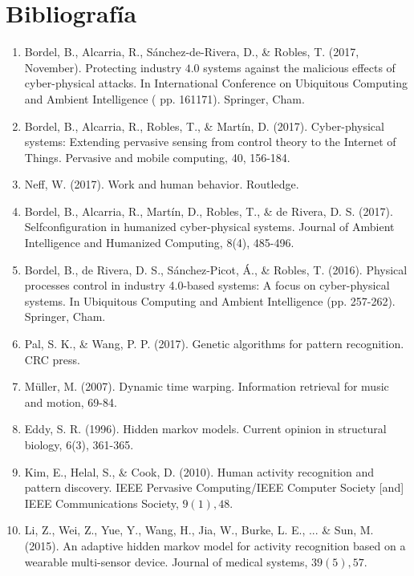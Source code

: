 \documentclass[10pt]{article}
\begin{document}
\section{Bibliografía}
\begin{enumerate}
  \item Bordel, B., Alcarria, R., Sánchez-de-Rivera, D., \& Robles, T. (2017, November). Protecting industry $4.0$ systems against the malicious effects of cyber-physical attacks. In International Conference on Ubiquitous Computing and Ambient Intelligence ( $\mathrm{pp}$. 161171). Springer, Cham.

  \item Bordel, B., Alcarria, R., Robles, T., \& Martín, D. (2017). Cyber-physical systems: Extending pervasive sensing from control theory to the Internet of Things. Pervasive and mobile computing, 40, 156-184.

  \item Neff, W. (2017). Work and human behavior. Routledge.

  \item Bordel, B., Alcarria, R., Martín, D., Robles, T., \& de Rivera, D. S. (2017). Selfconfiguration in humanized cyber-physical systems. Journal of Ambient Intelligence and Humanized Computing, 8(4), 485-496.

  \item Bordel, B., de Rivera, D. S., Sánchez-Picot, Á., \& Robles, T. (2016). Physical processes control in industry 4.0-based systems: A focus on cyber-physical systems. In Ubiquitous Computing and Ambient Intelligence (pp. 257-262). Springer, Cham.

  \item Pal, S. K., \& Wang, P. P. (2017). Genetic algorithms for pattern recognition. CRC press.

  \item Müller, M. (2007). Dynamic time warping. Information retrieval for music and motion, 69-84.

  \item Eddy, S. R. (1996). Hidden markov models. Current opinion in structural biology, 6(3), 361-365.

  \item Kim, E., Helal, S., \& Cook, D. (2010). Human activity recognition and pattern discovery. IEEE Pervasive Computing/IEEE Computer Society [and] IEEE Communications Society, $9(1), 48 .$

  \item Li, Z., Wei, Z., Yue, Y., Wang, H., Jia, W., Burke, L. E., ... \& Sun, M. (2015). An adaptive hidden markov model for activity recognition based on a wearable multi-sensor device. Journal of medical systems, $39(5), 57 .$


\end{enumerate}
\end{document}

